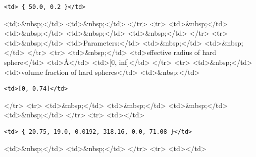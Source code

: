 \begin{verbatim}
<td> { 50.0, 0.2 }</td>
\end{verbatim}

\textless{}td\textgreater{}\&nbsp;\textless{}/td\textgreater{} \textless{}td\textgreater{}\&nbsp;\textless{}/td\textgreater{} \textless{}/tr\textgreater{} \textless{}tr\textgreater{} \textless{}td\textgreater{}\&nbsp;\textless{}/td\textgreater{} \textless{}td\textgreater{}\&nbsp;\textless{}/td\textgreater{} \textless{}td\textgreater{}\&nbsp;\textless{}/td\textgreater{} \textless{}td\textgreater{}\&nbsp;\textless{}/td\textgreater{} \textless{}/tr\textgreater{} \textless{}tr\textgreater{} \textless{}td\textgreater{}\&nbsp;\textless{}/td\textgreater{} \textless{}td\textgreater{}Parameters:\textless{}/td\textgreater{} \textless{}td\textgreater{}\&nbsp;\textless{}/td\textgreater{} \textless{}td\textgreater{}\&nbsp;\textless{}/td\textgreater{} \textless{}/tr\textgreater{} \textless{}tr\textgreater{} \textless{}td\textgreater{}\&nbsp;\textless{}/td\textgreater{} \textless{}td\textgreater{}effective radius of hard sphere\textless{}/td\textgreater{} \textless{}td\textgreater{}\AA{}\textless{}/td\textgreater{} \textless{}td\textgreater{}[0, inf]\textless{}/td\textgreater{} \textless{}/tr\textgreater{} \textless{}tr\textgreater{} \textless{}td\textgreater{}\&nbsp;\textless{}/td\textgreater{} \textless{}td\textgreater{}volume fraction of hard spheres\textless{}/td\textgreater{} \textless{}td\textgreater{}\&nbsp;\textless{}/td\textgreater{}

\begin{verbatim}
<td>[0, 0.74]</td>
\end{verbatim}

\textless{}/tr\textgreater{} \textless{}tr\textgreater{} \textless{}td\textgreater{}\&nbsp;\textless{}/td\textgreater{} \textless{}td\textgreater{}\&nbsp;\textless{}/td\textgreater{} \textless{}td\textgreater{}\&nbsp;\textless{}/td\textgreater{} \textless{}td\textgreater{}\&nbsp;\textless{}/td\textgreater{} \textless{}/tr\textgreater{} \textless{}tr\textgreater{} \textless{}td\textgreater{}\textless{}/td\textgreater{}

\begin{verbatim}
<td> { 20.75, 19.0, 0.0192, 318.16, 0.0, 71.08 }</td>
\end{verbatim}

\textless{}td\textgreater{}\&nbsp;\textless{}/td\textgreater{} \textless{}td\textgreater{}\&nbsp;\textless{}/td\textgreater{} \textless{}/tr\textgreater{} \textless{}tr\textgreater{} \textless{}td\textgreater{}\textless{}/td\textgreater{}

